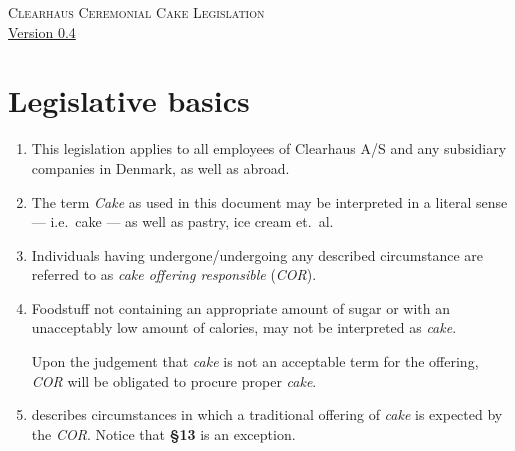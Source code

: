 \documentclass[a4paper, oneside, article]{memoir}
\newcounter{tbc}
\begin{document}
\thispagestyle{empty} %
\begin{center}
  \textsc{\huge Clearhaus Ceremonial Cake Legislation}
  \\
  {\footnotesize \href{https://semver.org/}{Version 0.4}}
\end{center}

\chapter{Legislative basics}

\begin{enumerate}[§ 1]
  \item This legislation applies to all employees of Clearhaus {\small A/S} and
    any subsidiary companies in Denmark, as well as abroad.

  \item The term \emph{Cake} as used in this document may be
    interpreted in a literal sense --- i.e.\ cake --- as well as pastry, ice
    cream et.\ al.

  \item Individuals having undergone/undergoing any described circumstance are
    referred to as \emph{cake offering responsible} (\emph{COR}).

  \item Foodstuff not containing an appropriate amount of sugar or with an
    unacceptably low amount of calories, may not be interpreted as
    \emph{cake}.

    Upon the judgement that \emph{cake} is not an acceptable term for the
    offering, \emph{COR} will be obligated to procure proper \emph{cake}.

  \item {} describes circumstances in which a traditional
    offering of \emph{cake} is expected by the \emph{COR}. Notice that
    \textbf{§13} is an exception.

  \setcounter{tbc}{\value{enumi}}
\end{enumerate}
\end{document}
